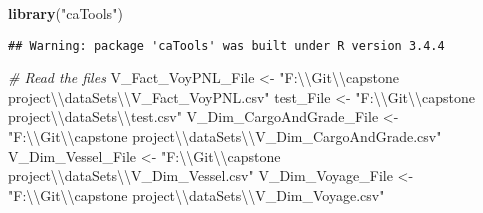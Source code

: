 \documentclass[]{article}
\newenvironment{Shaded}{\begin{snugshade}}{\end{snugshade}}
\newcommand{\KeywordTok}[1]{\textcolor[rgb]{0.13,0.29,0.53}{\textbf{#1}}}
\newcommand{\CharTok}[1]{\textcolor[rgb]{0.31,0.60,0.02}{#1}}
\newcommand{\StringTok}[1]{\textcolor[rgb]{0.31,0.60,0.02}{#1}}
\newcommand{\CommentTok}[1]{\textcolor[rgb]{0.56,0.35,0.01}{\textit{#1}}}
\newcommand{\NormalTok}[1]{#1}
\begin{document}
\begin{Shaded}
\begin{Highlighting}[]
\KeywordTok{library}\NormalTok{(}\StringTok{"caTools"}\NormalTok{)}
\end{Highlighting}
\end{Shaded}

\begin{verbatim}
## Warning: package 'caTools' was built under R version 3.4.4
\end{verbatim}

\begin{Shaded}
\begin{Highlighting}[]
\CommentTok{# Read the files}
\NormalTok{V_Fact_VoyPNL_File <-}\StringTok{ "F:}\CharTok{\textbackslash{}\textbackslash{}}\StringTok{Git}\CharTok{\textbackslash{}\textbackslash{}}\StringTok{capstone project}\CharTok{\textbackslash{}\textbackslash{}}\StringTok{dataSets}\CharTok{\textbackslash{}\textbackslash{}}\StringTok{V_Fact_VoyPNL.csv"}
\NormalTok{test_File <-}\StringTok{ "F:}\CharTok{\textbackslash{}\textbackslash{}}\StringTok{Git}\CharTok{\textbackslash{}\textbackslash{}}\StringTok{capstone project}\CharTok{\textbackslash{}\textbackslash{}}\StringTok{dataSets}\CharTok{\textbackslash{}\textbackslash{}}\StringTok{test.csv"}
\NormalTok{V_Dim_CargoAndGrade_File <-}\StringTok{ "F:}\CharTok{\textbackslash{}\textbackslash{}}\StringTok{Git}\CharTok{\textbackslash{}\textbackslash{}}\StringTok{capstone project}\CharTok{\textbackslash{}\textbackslash{}}\StringTok{dataSets}\CharTok{\textbackslash{}\textbackslash{}}\StringTok{V_Dim_CargoAndGrade.csv"}
\NormalTok{V_Dim_Vessel_File <-}\StringTok{ "F:}\CharTok{\textbackslash{}\textbackslash{}}\StringTok{Git}\CharTok{\textbackslash{}\textbackslash{}}\StringTok{capstone project}\CharTok{\textbackslash{}\textbackslash{}}\StringTok{dataSets}\CharTok{\textbackslash{}\textbackslash{}}\StringTok{V_Dim_Vessel.csv"}
\NormalTok{V_Dim_Voyage_File <-}\StringTok{ "F:}\CharTok{\textbackslash{}\textbackslash{}}\StringTok{Git}\CharTok{\textbackslash{}\textbackslash{}}\StringTok{capstone project}\CharTok{\textbackslash{}\textbackslash{}}\StringTok{dataSets}\CharTok{\textbackslash{}\textbackslash{}}\StringTok{V_Dim_Voyage.csv"}


\end{Highlighting}
\end{Shaded}
\end{document}
